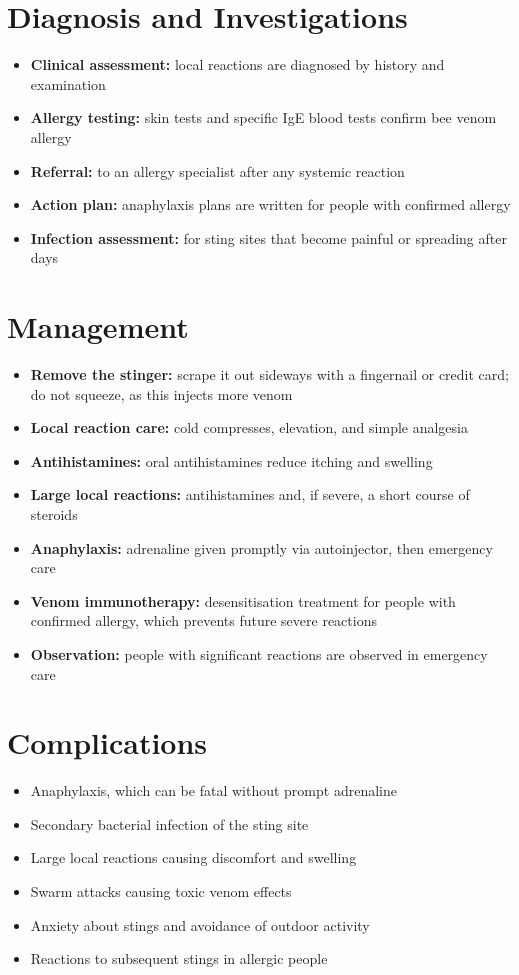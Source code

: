 \section*{Diagnosis and Investigations}
\begin{itemize}
    \item \textbf{Clinical assessment:} local reactions are diagnosed by history and examination
    \item \textbf{Allergy testing:} skin tests and specific IgE blood tests confirm bee venom allergy
    \item \textbf{Referral:} to an allergy specialist after any systemic reaction
    \item \textbf{Action plan:} anaphylaxis plans are written for people with confirmed allergy
    \item \textbf{Infection assessment:} for sting sites that become painful or spreading after days
\end{itemize}

\section*{Management}
\begin{itemize}
    \item \textbf{Remove the stinger:} scrape it out sideways with a fingernail or credit card; do not squeeze, as this injects more venom
    \item \textbf{Local reaction care:} cold compresses, elevation, and simple analgesia
    \item \textbf{Antihistamines:} oral antihistamines reduce itching and swelling
    \item \textbf{Large local reactions:} antihistamines and, if severe, a short course of steroids
    \item \textbf{Anaphylaxis:} adrenaline given promptly via autoinjector, then emergency care
    \item \textbf{Venom immunotherapy:} desensitisation treatment for people with confirmed allergy, which prevents future severe reactions
    \item \textbf{Observation:} people with significant reactions are observed in emergency care
\end{itemize}

\section*{Complications}
\begin{itemize}
    \item Anaphylaxis, which can be fatal without prompt adrenaline
    \item Secondary bacterial infection of the sting site
    \item Large local reactions causing discomfort and swelling
    \item Swarm attacks causing toxic venom effects
    \item Anxiety about stings and avoidance of outdoor activity
    \item Reactions to subsequent stings in allergic people
\end{itemize}

